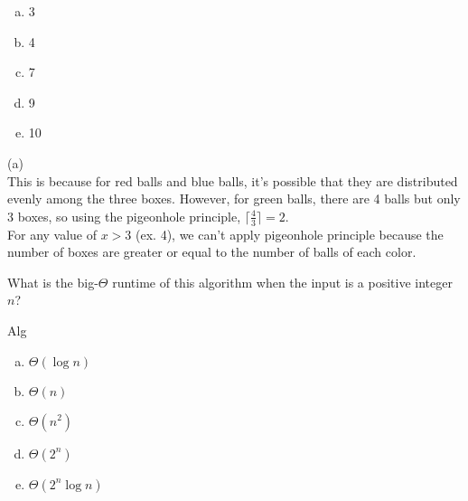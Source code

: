 \newpage
\begin{enumerate}[(a)]
	\item  3

	\item  4

	\item  7

	\item  9

	\item  10

\end{enumerate}
\begin{solution}

(a) \\
This is because for red balls and blue balls, it's possible that they are distributed evenly among the three boxes. However, for green balls, there are 4 balls but only 3 boxes, so using the pigeonhole principle, $\lceil \frac{4}{3} \rceil = 2$. \\
For any value of $ x > 3$ (ex. 4), we can't apply pigeonhole principle because the number of boxes are greater or equal to the number of balls of each color.

\end{solution}


What is the big-$\Theta$ runtime of this algorithm when the input is a positive integer $n$?

\begin{algorithm}[H]
    \DontPrintSemicolon
    \BlankLine
     \caption{Alg}
\end{algorithm}

\begin{enumerate}[a)]
\item $\Theta(\log n)$
\item $\Theta(n)$
\item $\Theta(n^2)$
\item $\Theta(2^n)$
\item $\Theta(2^n \log n)$
\end{enumerate}


